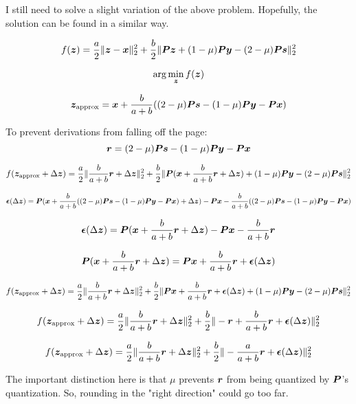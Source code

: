 \documentclass{article}
\begin{document}
I still need to solve a slight variation of the above problem. Hopefully, the solution can be found in a similar way.

\begin{equation}
f(\bm{z}) =  \frac{a}{2}\|\bm{z} - \bm{x}\|_2^2 + \frac{b}{2}\|\bm{P}\bm{z} + (1 - \mu)\bm{P}\bm{y} - (2 - \mu)\bm{P}\bm{s}\|_2^2
\end{equation}

\begin{equation}
\arg\min_{\bm{z}} f(\bm{z})
\end{equation}

\begin{equation}
\bm{z}_{\text{approx}} = \bm{x} + \frac{b}{a + b}((2 - \mu)\bm{P}\bm{s} - (1 - \mu)\bm{P}\bm{y} - \bm{P}\bm{x})
\end{equation}

To prevent derivations from falling off the page:
\begin{equation}
\bm{r} = (2 - \mu)\bm{P}\bm{s} - (1 - \mu)\bm{P}\bm{y} - \bm{P}\bm{x}
\end{equation}


\begin{equation}
f(\bm{z}_{\text{approx}} + \Delta\bm{z}) = \frac{a}{2}\|\frac{b}{a + b}\bm{r} + \Delta\bm{z}\|_2^2 + \frac{b}{2}\|\bm{P}(\bm{x} + \frac{b}{a + b}\bm{r} + \Delta\bm{z}) + (1 - \mu)\bm{P}\bm{y} - (2 - \mu)\bm{P}\bm{s}\|_2^2
\end{equation}

\begin{equation}
\bm{\epsilon}(\Delta\bm{z}) = \bm{P}(\bm{x} + \frac{b}{a + b}((2 - \mu)\bm{P}\bm{s} - (1 - \mu)\bm{P}\bm{y} - \bm{P}\bm{x}) + \Delta\bm{z}) - \bm{P}\bm{x} - \frac{b}{a + b}((2 - \mu)\bm{P}\bm{s} - (1 - \mu)\bm{P}\bm{y} - \bm{P}\bm{x})
\end{equation}

\begin{equation}
\bm{\epsilon}(\Delta\bm{z}) = \bm{P}(\bm{x} + \frac{b}{a + b}\bm{r} + \Delta\bm{z}) - \bm{P}\bm{x} - \frac{b}{a + b}\bm{r}
\end{equation}

\begin{equation}
\bm{P}(\bm{x} + \frac{b}{a + b}\bm{r} + \Delta\bm{z}) = \bm{P}\bm{x} + \frac{b}{a + b}\bm{r}  + \bm{\epsilon}(\Delta\bm{z})
\end{equation}

\begin{equation}
f(\bm{z}_{\text{approx}} + \Delta\bm{z}) = \frac{a}{2}\|\frac{b}{a + b}\bm{r} + \Delta\bm{z}\|_2^2 + \frac{b}{2}\|\bm{P}\bm{x} + \frac{b}{a + b}\bm{r}  + \bm{\epsilon}(\Delta\bm{z}) + (1 - \mu)\bm{P}\bm{y} - (2 - \mu)\bm{P}\bm{s}\|_2^2
\end{equation}

\begin{equation}
f(\bm{z}_{\text{approx}} + \Delta\bm{z}) = \frac{a}{2}\|\frac{b}{a + b}\bm{r} + \Delta\bm{z}\|_2^2 + \frac{b}{2}\|-\bm{r} + \frac{b}{a + b}\bm{r}  + \bm{\epsilon}(\Delta\bm{z})\|_2^2
\end{equation}

\begin{equation}
f(\bm{z}_{\text{approx}} + \Delta\bm{z}) = \frac{a}{2}\|\frac{b}{a + b}\bm{r} + \Delta\bm{z}\|_2^2 + \frac{b}{2}\| -\frac{a}{a + b}\bm{r}  + \bm{\epsilon}(\Delta\bm{z})\|_2^2
\end{equation}

The important distinction here is that $\mu$ prevents $\bm{r}$ from being quantized by $\bm{P}$'s quantization.  So, rounding in the "right direction" could go too far. 
\end{document}

